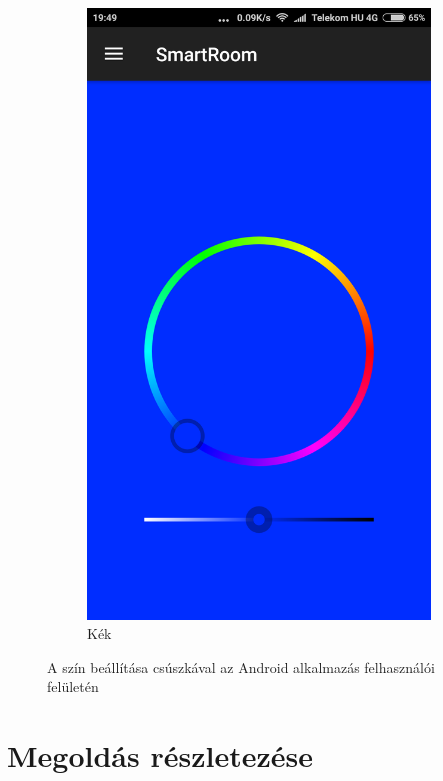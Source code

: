 \documentclass[12pt]{extarticle}
\begin{document}
\begin{figure}[h!]
\begin{subfigure}[b]{0.3\linewidth}
			\includegraphics[width=\linewidth]{kek2.png}
			\caption{Kék}
		\end{subfigure}
		\caption{A szín beállítása csúszkával az Android alkalmazás felhasználói felületén}
		\label{}
	\end{figure}


	
	\section{Megoldás részletezése}
	
\end{document}
